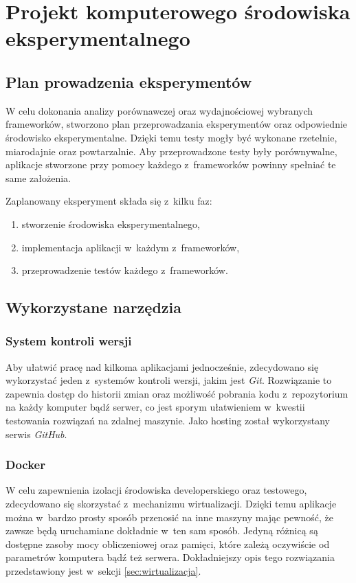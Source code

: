 \chapter{Projekt komputerowego środowiska eksperymentalnego}
\section{Plan prowadzenia eksperymentów}
W celu dokonania analizy porównawczej oraz wydajnościowej wybranych frameworków, stworzono plan przeprowadzania eksperymentów oraz odpowiednie środowisko eksperymentalne. Dzięki temu testy mogły być wykonane rzetelnie, miarodajnie oraz powtarzalnie. Aby przeprowadzone testy były porównywalne, aplikacje stworzone przy pomocy każdego z~frameworków powinny spełniać te same założenia.

Zaplanowany eksperyment składa się z~kilku faz:
\begin{enumerate}
  \item stworzenie środowiska eksperymentalnego,
  \item implementacja aplikacji w~każdym z~frameworków,
  \item przeprowadzenie testów każdego z~frameworków.
\end{enumerate}

\section{Wykorzystane narzędzia}
\subsection{System kontroli wersji}
Aby ułatwić pracę nad kilkoma aplikacjami jednocześnie, zdecydowano się wykorzystać jeden z~systemów kontroli wersji, jakim jest \emph{Git}. Rozwiązanie to zapewnia dostęp do historii zmian oraz możliwość pobrania kodu z~repozytorium na każdy komputer bądź serwer, co jest sporym ułatwieniem w~kwestii testowania rozwiązań na zdalnej maszynie. Jako hosting został wykorzystany serwis \emph{GitHub}.

\subsection{Docker}
W celu zapewnienia izolacji środowiska developerskiego oraz testowego, zdecydowano się skorzystać z~mechanizmu wirtualizacji. Dzięki temu aplikacje można w~bardzo prosty sposób przenosić na inne maszyny mając pewność, że zawsze będą uruchamiane dokładnie w~ten sam sposób. Jedyną różnicą są dostępne zasoby mocy obliczeniowej oraz pamięci, które zależą oczywiście od parametrów komputera bądź też serwera. Dokładniejszy opis tego rozwiązania przedstawiony jest w~sekcji \ref{sec:wirtualizacja}.

